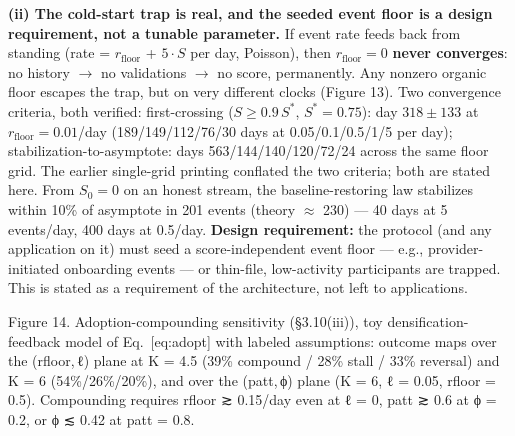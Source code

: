 \documentclass[
]{article}
\begin{document}
\textbf{(ii) The cold-start trap is real, and the seeded event floor is
a design requirement, not a tunable parameter.} If event rate feeds back
from standing (rate = \(r_{\mathrm{floor}}\) + \(5\cdot S\) per day,
Poisson), then \(r_{\mathrm{floor}} = 0\) \textbf{never converges}: no
history \(\to\) no validations \(\to\) no score, permanently. Any
nonzero organic floor escapes the trap, but on very different clocks
(Figure 13). Two convergence criteria, both verified: first-crossing
(\(S \geq 0.9\,S^*\), \(S^* = 0.75\)): day \(318 \pm 133\) at
\(r_{\mathrm{floor}} = 0.01\)/day (189/149/112/76/30 days at
0.05/0.1/0.5/1/5 per day); stabilization-to-asymptote: days
563/144/140/120/72/24 across the same floor grid. The earlier
single-grid printing conflated the two criteria; both are stated here.
From \(S_{0} = 0\) on an honest stream, the baseline-restoring law
stabilizes within 10\% of asymptote in 201 events (theory \(\approx\)
230) --- 40 days at 5 events/day, 400 days at 0.5/day. \textbf{Design
requirement:} the protocol (and any application on it) must seed a
score-independent event floor --- e.g., provider-initiated onboarding
events --- or thin-file, low-activity participants are trapped. This is
stated as a requirement of the architecture, not left to applications.

Figure 14. Adoption-compounding sensitivity (§3.10(iii)), toy
densification-feedback model of Eq.~{[}eq:adopt{]} with labeled
assumptions: outcome maps over the {(rfloor, ℓ)} plane at {K = 4.5}
(39\% compound / 28\% stall / 33\% reversal) and {K = 6}
(54\%/26\%/20\%), and over the {(patt, ϕ)} plane ({K = 6}, {ℓ = 0.05},
{rfloor = 0.5}). Compounding requires {rfloor ≳ 0.15}/day even at
{ℓ = 0}, {patt ≳ 0.6} at {ϕ = 0.2}, or {ϕ ≲ 0.42} at {patt = 0.8}.
\end{document}
